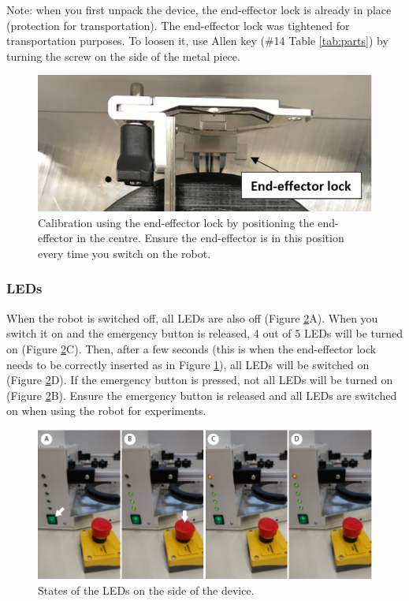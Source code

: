 \documentclass[10pt,oneside,a4paper]{article}
\begin{document}
Note: when you first unpack the device, the end-effector lock is already in place (protection for transportation). The end-effector lock was tightened for transportation purposes. To loosen it, use Allen key (\#14 Table \ref{tab:parts}) by turning the screw on the side of the metal piece. 

\begin{figure}[h!]
\begin{center}
\includegraphics[width=\columnwidth]{images/Hardware/Calibration.png}
\caption{Calibration using the end-effector lock by positioning the end-effector in the centre. Ensure the end-effector is in this position every time you switch on the robot. }
\label{fig:Calibration}
\end{center}
\end{figure}

\subsubsection*{LEDs}
When the robot is switched off, all LEDs are also off (Figure \ref{fig:LED}A). When you switch it on and the emergency button is released, 4 out of 5 LEDs will be turned on (Figure \ref{fig:LED}C). Then, after a few seconds (this is when the end-effector lock needs to be correctly inserted as in Figure \ref{fig:Calibration}), all LEDs will be switched on (Figure \ref{fig:LED}D). If the emergency button is pressed, not all LEDs will be turned on (Figure \ref{fig:LED}B). Ensure the emergency button is released and all LEDs are switched on when using the robot for experiments. 

\begin{figure}[h!]
\begin{center}
\includegraphics[width=\columnwidth]{images/Hardware/LEDs.png}
\caption{States of the LEDs on the side of the device.}
\label{fig:LED}
\end{center}
\end{figure}
\end{document}
